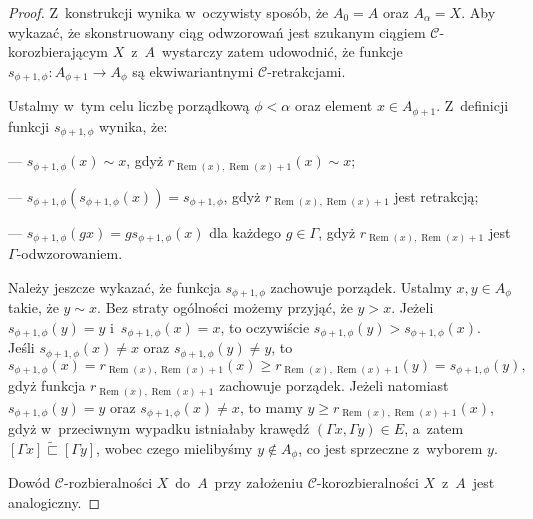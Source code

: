 \begin{proof}
Z~konstrukcji wynika w~oczywisty sposób, że $A_0=A$ oraz $A_\alpha=X$. Aby wykazać, że skonstruowany ciąg odwzorowań jest szukanym ciągiem $\mathcal{C}$-korozbierającym $X$~z~$A$~wystarczy zatem udowodnić, że funkcje \mbox{$s_{\phi+1,\phi}\colon A_{\phi+1}\to A_{\phi}$} są ekwiwariantnymi $\mathcal{C}$-retrakcjami.

Ustalmy w~tym celu liczbę porządkową $\phi<\alpha$ oraz element $x\in A_{\phi+1}$. Z~definicji funkcji $s_{\phi+1,\phi}$ wynika, że:
\begin{compactitem}
\item[---] $s_{\phi+1,\phi}(x)\sim x$, gdyż $r_{\operatorname{Rem}(x),\operatorname{Rem}(x)+1}(x)\sim x$;
\item[---] $s_{\phi+1,\phi}\left(s_{\phi+1,\phi}(x)\right)=s_{\phi+1,\phi}$, gdyż $r_{\operatorname{Rem}(x),\operatorname{Rem}(x)+1}$ jest retrakcją;
\item[---] $s_{\phi+1,\phi}(gx)=gs_{\phi+1,\phi}(x)$ dla każdego $g\in \Gamma$, gdyż $r_{\operatorname{Rem}(x),\operatorname{Rem}(x)+1}$ jest \mbox{$\Gamma$-odwzorowaniem}.
\end{compactitem}

Należy jeszcze wykazać, że funkcja $s_{\phi+1,\phi}$ zachowuje porządek. Ustalmy $x,y\in A_{\phi}$ takie, że $y\sim x$. Bez straty ogólności możemy przyjąć, że $y>x$. Jeżeli $s_{\phi+1,\phi}(y)= y$ i~$s_{\phi+1,\phi}(x)= x$, to oczywiście $s_{\phi+1,\phi}(y)>s_{\phi+1,\phi}(x)$. Jeśli $s_{\phi+1,\phi}(x)\not=x$ oraz $s_{\phi+1,\phi}(y)\not=y$, to \[s_{\phi+1,\phi}(x)=r_{\operatorname{Rem}(x),\operatorname{Rem}(x)+1}(x)\geq r_{\operatorname{Rem}(x),\operatorname{Rem}(x)+1}(y)=s_{\phi+1,\phi}(y),\] gdyż funkcja $r_{\operatorname{Rem}(x),\operatorname{Rem}(x)+1}$ zachowuje porządek. Jeżeli natomiast $s_{\phi+1,\phi}(y)=y$ oraz $s_{\phi+1,\phi}(x)\not=x$, to mamy $y\geq r_{\operatorname{Rem}(x),\operatorname{Rem}(x)+1}(x)$, gdyż w~przeciwnym wypadku istniałaby krawędź $(\Gamma x,\Gamma y)\in E$, a~zatem $[\Gamma x]\widetilde{\sqsubset}[\Gamma y]$, wobec czego mielibyśmy $y\not\in A_{\phi}$, co jest sprzeczne z~wyborem $y$.
 
Dowód $\mathcal{C}$-rozbieralności $X$~do~$A$~przy założeniu $\mathcal{C}$-korozbieralności $X$~z~$A$~jest analogiczny.
\end{proof}

